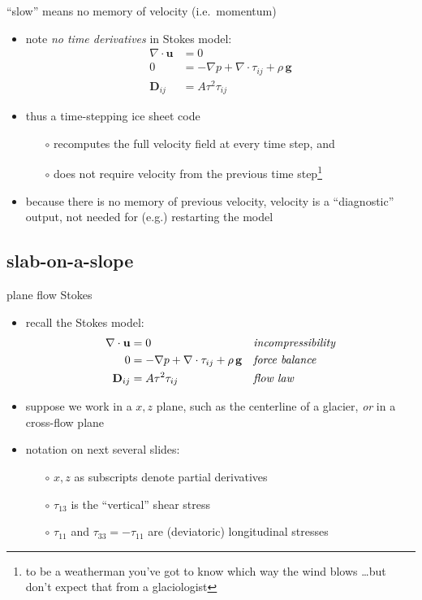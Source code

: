 \begin{frame}{``slow'' means no memory of velocity (i.e.~momentum)}

\begin{itemize}
\item note \emph{no time derivatives} in Stokes model:
\scriptsize
\begin{align*}
\nabla \cdot \mathbf{u} &= 0 \\
0 &= - \nabla p + \nabla \cdot \tau_{ij} + \rho\, \mathbf{g} \\
\mathbf{D}_{ij} &= A \tau^2 \tau_{ij}
\end{align*}
\normalsize
\item thus a time-stepping ice sheet code
  \begin{itemize}
  \item[$\circ$] recomputes the full velocity field at every time step, and
  \item[$\circ$] does not require velocity from the previous time step\footnote{to be a weatherman you've got to know which way the wind blows \dots but don't expect that from a glaciologist}
  \end{itemize}

\medskip
\item because there is no memory of previous velocity, velocity is a ``diagnostic'' output, not needed for (e.g.) restarting the model
\end{itemize}
\end{frame}


\subsection{slab-on-a-slope}

\begin{frame}{plane flow Stokes}

\begin{itemize}
\item recall the Stokes model:
\small
\begin{align*}
\nabla \cdot \mathbf{u} &= 0 &&\text{\emph{incompressibility}} \\
0 &= - \nabla p + \nabla \cdot \tau_{ij} + \rho\, \mathbf{g} &&\text{\emph{force balance}} \\
\mathbf{D}_{ij} &= A \tau^2 \tau_{ij} &&\text{\emph{flow law}}
\end{align*}
\normalsize

\bigskip
\item suppose we work in a $x,z$ plane, such as the centerline of a glacier, \emph{or} in a cross-flow plane

\item notation on next several slides:
  \begin{itemize}
  \item[$\circ$] $x,z$ as subscripts denote partial derivatives
  \item[$\circ$] $\tau_{13}$ is the ``vertical'' shear stress
  \item[$\circ$] $\tau_{11}$ and $\tau_{33}=-\tau_{11}$ are (deviatoric) longitudinal stresses 
  \end{itemize}
\end{itemize}
\end{frame}

